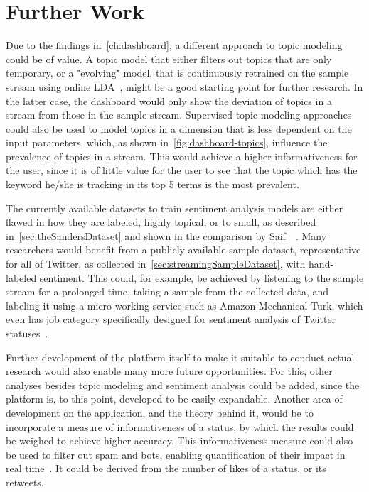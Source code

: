 \chapter{Further Work}
\label{ch:furtherWork}

Due to the findings in~\ref{ch:dashboard}, %
a different approach to topic modeling could be of value.
A topic model that either filters out topics that are only temporary,
or a "evolving" model, that is continuously retrained on the sample stream using online LDA~\cite{hoffman2010online},
might be a good starting point for further research.
In the latter case, the dashboard would only show the deviation of topics in a stream from those in the sample stream.
Supervised topic modeling approaches could also be used to model topics in a dimension that is less dependent on the input parameters,
which, as shown in~\ref{fig:dashboard-topics}, influence the prevalence of topics in a stream.
This would achieve a higher informativeness for the user, since it is of little value for the user to
see that the topic which has the keyword he/she is tracking in its top 5 terms is the most prevalent.
\par
The currently available datasets to train sentiment analysis models are either flawed in how they are labeled, highly topical,
or to small, as described in~\ref{sec:theSandersDataset} and shown in the comparison by Saif~\etAl~\cite{Saif2013}.
Many researchers would benefit from a publicly available sample dataset, representative for all of Twitter,
as collected in~\ref{sec:streamingSampleDataset}, with hand-labeled sentiment.
This could, for example, be achieved by listening to the sample stream for a prolonged time,
taking a sample from the collected data, and labeling it using a micro-working service such as Amazon Mechanical Turk,
which even has job category specifically designed for sentiment analysis of Twitter statuses~\cite{mturk}.
\par
Further development of the platform itself to make it suitable to conduct actual research
would also enable many more future opportunities.
For this, other analyses besides topic modeling and sentiment analysis could be added,
since the platform is, to this point, developed to be easily expandable.
Another area of development on the application, and the theory behind it,
would be to incorporate a measure of informativeness of a status,
by which the results could be weighed to achieve higher accuracy.
This informativeness measure could also be used to filter out spam and bots,
enabling quantification of their impact in real time~\cite{haustein2016tweets}.
It could be derived from the number of likes of a status, or its retweets.

